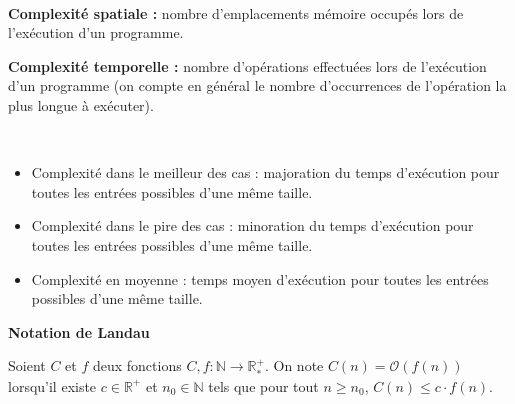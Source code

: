 \documentclass[10pt,fleqn]{article} %
\begin{document}

\vspace{2cm}
\pagestyle{fancy}
\thispagestyle{plain}


\begin{defi}
~\\
\textbf{Complexité spatiale :} nombre d'emplacements mémoire occupés lors de l'exécution d'un programme.

\noindent\textbf{Complexité temporelle :} nombre d'opérations effectuées lors de l'exécution d'un programme (on compte en général le nombre d'occurrences de l'opération la plus longue à exécuter).

\end{defi}

\begin{defi}
~\\
\begin{itemize}[label=,font=\color{ocre}] 
\item Complexité dans le meilleur des cas : majoration du temps d'exécution pour toutes les entrées possibles d'une même taille.

\item Complexité dans le pire des cas : minoration du temps d'exécution pour toutes les entrées possibles d'une même taille.

\item Complexité en moyenne : temps moyen d'exécution pour toutes les entrées possibles d'une même taille.
\end{itemize}
\end{defi}

\begin{defi}
\textbf{Notation de Landau}

Soient $C$ et $f$ deux fonctions $C,f : \mathbb{N} \rightarrow \mathbb{R}^{+}_{*}$. On note $C(n)=\mathcal{O}(f(n))$ lorsqu'il existe $c\in\mathbb{R}^+$ et $n_0\in\mathbb{N}$ tels que pour tout $n\geq n_0$,  $ C(n) \leq c\cdot f(n)$.
\end{defi}
\end{document}
